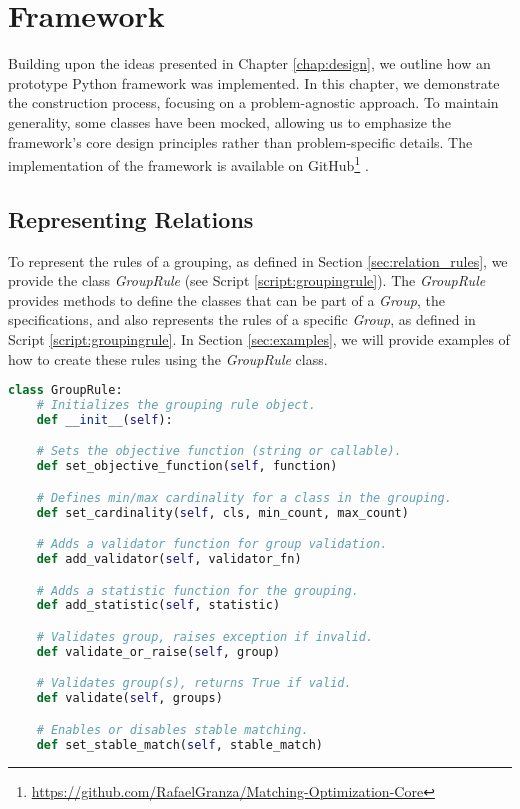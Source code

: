 \chapter{Framework} \label{chap:framework}

    Building upon the ideas presented in Chapter \ref{chap:design}, we outline how an prototype Python framework was implemented. In this chapter, we demonstrate the construction process, focusing on a problem-agnostic approach. To maintain generality, some classes have been mocked, allowing us to emphasize the framework's core design principles rather than problem-specific details.
    The implementation of the framework is available on GitHub\footnote{\url{https://github.com/RafaelGranza/Matching-Optimization-Core}} \cite{myframework}.

    \section{Representing Relations}
        To represent the rules of a grouping, as defined in Section \ref{sec:relation_rules}, we provide the class \textit{GroupRule} (see Script \ref{script:groupingrule}).
        The \textit{GroupRule} provides methods to define the classes that can be part of a \textit{Group}, the specifications, and also represents the rules of a specific \textit{Group}, as defined in Script \ref{script:groupingrule}.
        In Section \ref{sec:examples}, we will provide examples of how to create these rules using the \textit{GroupRule} class.

        \begin{lstlisting}[language=Python, caption={\textit{GroupRule} class that defines valid \textit{Groups} and its specifications. Such as min/max cardinality of each relation, group validation functions, statistic functions, and object function.}, label={script:groupingrule}]
class GroupRule:
    # Initializes the grouping rule object.
    def __init__(self):

    # Sets the objective function (string or callable).
    def set_objective_function(self, function)

    # Defines min/max cardinality for a class in the grouping.
    def set_cardinality(self, cls, min_count, max_count)

    # Adds a validator function for group validation.
    def add_validator(self, validator_fn)

    # Adds a statistic function for the grouping.
    def add_statistic(self, statistic)

    # Validates group, raises exception if invalid.
    def validate_or_raise(self, group)

    # Validates group(s), returns True if valid.
    def validate(self, groups)

    # Enables or disables stable matching.
    def set_stable_match(self, stable_match)
\end{lstlisting}

